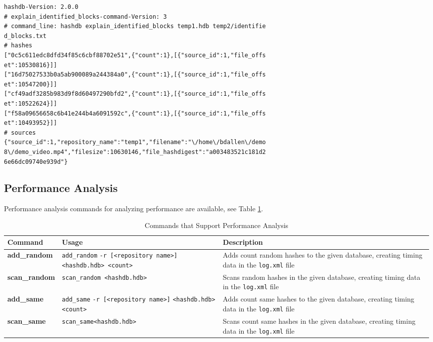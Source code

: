 \documentclass[11pt,fleqn]{article} %
\begin{document}
\begin{lstlisting}[float, caption={The \texttt{identified\_hashes\_and\_sources.txt} file produced by post-processing the \texttt{identified\_blocks.txt} file using the \texttt{explain\_identified\_blocks} command}, label=explainHashesAndSources]
 hashdb-Version: 2.0.0
# explain_identified_blocks-command-Version: 3
# command_line: hashdb explain_identified_blocks temp1.hdb temp2/identifie
d_blocks.txt
# hashes
["0c5c611edc8dfd34f85c6cbf88702e51",{"count":1},[{"source_id":1,"file_offs
et":10530816}]]
["16d75027533b0a5ab900089a244384a0",{"count":1},[{"source_id":1,"file_offs
et":10547200}]]
["cf49adf3285b983d9f8d60497290bfd2",{"count":1},[{"source_id":1,"file_offs
et":10522624}]]
["f58a09656658c6b41e244b4a6091592c",{"count":1},[{"source_id":1,"file_offs
et":10493952}]]
# sources
{"source_id":1,"repository_name":"temp1","filename":"\/home\/bdallen\/demo
8\/demo_video.mp4","filesize":10630146,"file_hashdigest":"a003483521c181d2
6e66dc09740e939d"}
\end{lstlisting}

\subsection{Performance Analysis}
Performance analysis commands for analyzing \hdb performance are available, see Table \ref{tab:analysis}.

\begin{table}[!ht]
\centering
\caption{Commands that Support \hdb Performance Analysis}
\label{tab:analysis}
\begin{tabular}{|p{3.5 cm}|p{6 cm}|p{4 cm}|}
\hline \hline
\textbf{Command} & \textbf{Usage} & \textbf{Description} \\
\hline
\textbf{add\_random} & \verb+add_random+ \verb+-r [<repository name>]+ \verb+<hashdb.hdb> <count>+ & Adds count random hashes to the given database, creating timing data in the \texttt{log.xml} file\\
\hline
\textbf{scan\_random} & \verb+scan_random <hashdb.hdb>+ & Scans random hashes in the given database, creating timing data in the \texttt{log.xml} file\\
\hline
\textbf{add\_same} & \verb+add_same+ \verb+-r [<repository name>]+ \verb+<hashdb.hdb> <count>+ & Adds count same hashes to the given database, creating timing data in the \texttt{log.xml} file\\
\hline
\textbf{scan\_same} & \verb+scan_same<hashdb.hdb>+ & Scans count same hashes in the given database, creating timing data in the \texttt{log.xml} file\\
\hline
\end{tabular}
\end{table}
\end{document}
